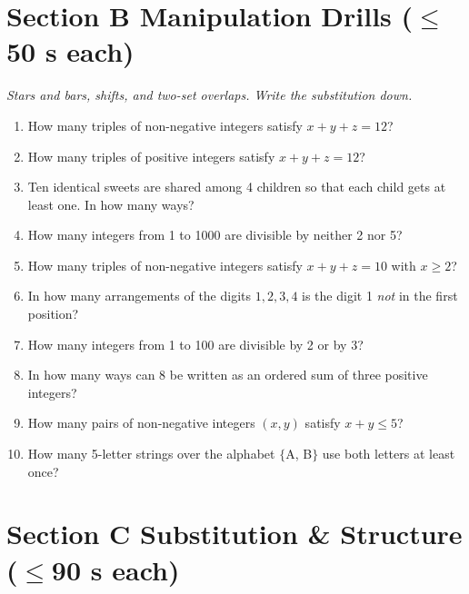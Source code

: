 \documentclass[11pt,a4paper]{article}
\begin{document}
\section*{Section B \quad Manipulation Drills \hfill{\normalfont\small($\leq$50 s each)}}

\noindent\textit{Stars and bars, shifts, and two-set overlaps. Write the substitution down.}

\begin{enumerate}

\item How many triples of non-negative integers satisfy $x+y+z=12$?

\item How many triples of positive integers satisfy $x+y+z=12$?

\item Ten identical sweets are shared among 4 children so that each child gets at least one. In how many ways?

\item How many integers from 1 to 1000 are divisible by neither 2 nor 5?

\item How many triples of non-negative integers satisfy $x+y+z=10$ with $x\geq2$?

\item In how many arrangements of the digits $1,2,3,4$ is the digit 1 \emph{not} in the first position?

\item How many integers from 1 to 100 are divisible by 2 or by 3?

\item In how many ways can 8 be written as an ordered sum of three positive integers?

\item How many pairs of non-negative integers $(x,y)$ satisfy $x+y\leq5$?

\item How many 5-letter strings over the alphabet $\{$A, B$\}$ use both letters at least once?

\end{enumerate}

\section*{Section C \quad Substitution \& Structure \hfill{\normalfont\small($\leq$90 s each)}}
\end{document}
